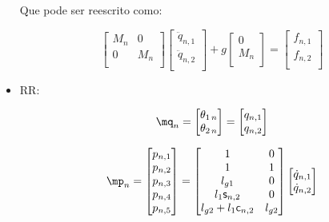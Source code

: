 \begin{itemize}
Que pode ser reescrito como:

$$
\begin{bmatrix}
M_n & 0 \\
0 & M_n \\
\end{bmatrix}
\begin{bmatrix}
\ddot{q}_{n,1} \\
\ddot{q}_{n,2} \\
\end{bmatrix}
+
g \begin{bmatrix}
0 \\
M_n \\
\end{bmatrix}
=
\begin{bmatrix}
f_{n,1} \\
f_{n,2} \\
\end{bmatrix}
$$

\item RR:

\begin{equation}
	\mq_n = \begin{bmatrix}
	\theta_{1 \, n} \\
	\theta_{2 \, n} \\
	\end{bmatrix}
	=
	\begin{bmatrix}
	q_{n,1} \\
	q_{n,2} \\
	\end{bmatrix}
\end{equation}

\begin{equation}
	\mp_n = \begin{bmatrix}
	p_{n,1} \\
	p_{n,2} \\
	p_{n,3} \\
	p_{n,4} \\
	p_{n,5} \\
	\end{bmatrix}
	=
	\begin{bmatrix}
	1 & 0 \\
	1 & 1 \\
	l_{g1} & 0\\
	l_1 \ssin_{n,2} & 0 \\
	l_{g2} + l_1 \ccos_{n,2} & l_{g2}
	\end{bmatrix}
	\begin{bmatrix}
	\dot{q}_{n,1} \\
	\dot{q}_{n,2} \\
	\end{bmatrix}
\end{equation}


\end{itemize}
